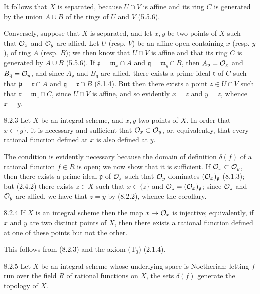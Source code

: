 \documentclass[../main.tex]{subfiles}
\begin{document}
It follows that $X$ is separated, because $U\cap V$ is affine and its ring $C$ is generated by the union $A\cup B$ of the rings of $U$ and $V$ (5.5.6).

Conversely, suppose that $X$ is separated, and let $x,y$ be two points of $X$ such that $\mathcal{O}_x$ and $\mathcal{O}_y$ are allied.
Let $U$ (resp. $V$) be an affine open containing $x$ (resp. $y$), of ring $A$ (resp. $B$); we then know that $U\cap V$ is affine and that its ring $C$ is generated by $A\cup B$ (5.5.6).
If $\mathfrak{p}=\mathfrak{m}_x\cap A$ and $\mathfrak{q}=\mathfrak{m}_y\cap B$, then $A_\mathfrak{p}=\mathcal{O}_x$ and $B_\mathfrak{q}=\mathcal{O}_y$, and since $A_\mathfrak{p}$ and $B_\mathfrak{q}$ are allied, there exists a prime ideal $\mathfrak{r}$ of $C$ such that $\mathfrak{p}=\mathfrak{r}\cap A$ and $\mathfrak{q}=\mathfrak{r}\cap B$ (8.1.4).
But then there exists a point $z\in U\cap V$ such that $\mathfrak{r}=\mathfrak{m}_z\cap C$, since $U\cap V$ is affine, and so evidently $x=z$ and $y=z$, whence $x=y$.

\begin{env}[Corollary]{8.2.3}
    Let $X$ be an integral scheme, and $x,y$ two points of $X$.
    In order that $x\in\overline{\{y\}}$, it is necessary and sufficient that $\mathcal{O}_x\subset\mathcal{O}_y$, or, equivalently, that every rational function defined at $x$ is also defined at $y$.
\end{env}    

The condition is evidently necessary because the domain of definition $\delta(f)$ of a rational function $f\in R$ is open; we now show that it is sufficient.
If $\mathcal{O}_x\subset\mathcal{O}_y$, then there exists a prime ideal $\mathfrak{p}$ of $\mathcal{O}_x$ such that $\mathcal{O}_y$ dominates $(\mathcal{O}_x)_\mathfrak{p}$ (8.1.3); but (2.4.2) there exists $z\in X$ such that $x\in\overline{\{z\}}$ and $\mathcal{O}_z=(\mathcal{O}_x)_\mathfrak{p}$; since $\mathcal{O}_z$ and $\mathcal{O}_y$ are allied, we have that $z=y$ by (8.2.2), whence the corollary.

\begin{env}[Corollary]{8.2.4}
    If $X$ is an integral scheme then the map $x\to\mathcal{O}_x$ is injective; equivalently, if $x$ and $y$ are two distinct points of $X$, then there exists a rational function defined at one of these points but not the other.
\end{env}

This follows from (8.2.3) and the axiom ($\mathrm{T}_0$) (2.1.4).

\begin{env}[Corollary]{8.2.5}
    Let $X$ be an integral scheme whose underlying space is Noetherian; letting $f$ run over the field $R$ of rational functions on $X$, the sets $\delta(f)$ generate the topology of $X$.
\end{env}
\end{document}
